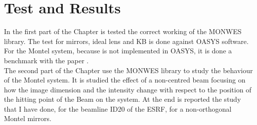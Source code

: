 \chapter{Test and Results}
\label{capitolo4}

\vspace{5cm}

In the first part of the Chapter is tested the correct working of the MONWES library. The test for mirrors, ideal lens and KB is done against OASYS software. For the Montel system, because is not implemented in OASYS, it is done a benchmark with the paper \cite{resta2015nested}.
\\
The second part of the Chapter use the MONWES library to study the behaviour of the Montel system. It is studied the effect of a non-centred beam focusing on how the image dimension and the intensity change with respect to the position of the hitting point of the Beam on the system. At the end is reported the study that I have done, for the beamline ID20 of the ESRF, for a non-orthogonal Montel mirrors.
\vspace{0.5cm}
